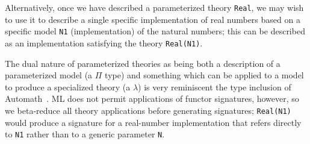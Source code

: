 Alternatively, once we have described a parameterized theory
\Verb|Real|, we may wish to use it to describe a single specific
implementation of real numbers based on a specific model \Verb|N1|
(implementation) of the natural numbers; this can be described as
an implementation satisfying the theory \Verb|Real(N1)|.

The dual nature of parameterized theories as being both a description
of a parameterized model (a $\Pi$ type) and something which can be
applied to a model to produce a specialized theory (a $\lambda$) is
very reminiscent the type inclusion of Automath~\cite{automath}.  ML
does not permit applications of functor signatures, however, so we
beta-reduce all theory applications before generating signatures;
\Verb|Real(N1)| would produce a signature for a real-number
implementation that refers directly to \Verb|N1| rather than to a
generic parameter \Verb|N|.


